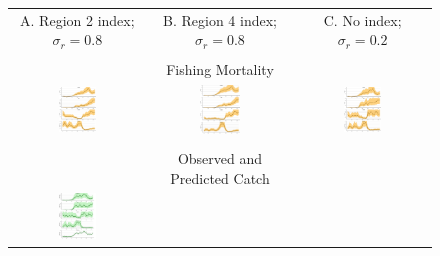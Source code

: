 \documentclass[12pt,letterpaper]{article}
\begin{document}
\begin{figure}
\begin{center}
{\scriptsize \sffamily
\begin{tabular}{ccc}
A. Region 2 index; $\sigma_r=0.8$ &
B. Region 4 index; $\sigma_r=0.8$ &
C. No index; $\sigma_r=0.2$ \\
\\
& Fishing Mortality\\
\hline
\includegraphics[width=0.30\textwidth]{./4-gear-runs_r2_est_FB1.pdf} &
\includegraphics[width=0.30\textwidth]{./4-gear-runs_r4_est_FB1.pdf} &
\includegraphics[width=0.30\textwidth]{./4-gear-runs_r0-sdrprior_est_FB1.pdf}\\
\\
& Observed and Predicted Catch\\
\hline
\includegraphics[width=0.30\textwidth]{./4-gear-runs_r2_est_catchB1.pdf} &

\end{tabular}}
\end{center}
\end{figure}
\end{document}
